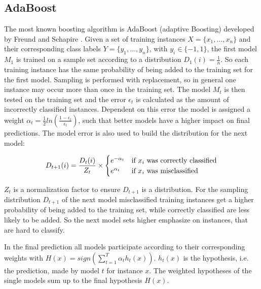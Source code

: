 \documentclass[10pt]{reportMaster}
\begin{document}
\subsection*{AdaBoost}
\label{sec:adaBoost}
The most known boosting algorithm is AdaBoost (adaptive Boosting) developed by Freund and Schapire \cite{boostingIntro}.
Given a set of training instances $X = \{x_1, ..., x_n\}$ and their corresponding class labels $Y = \{y_1, ..., y_n\}$, with $y_i \in \{-1, 1\}$, the first model $M_1$ is trained on a sample set according to a distribution $D_1(i) = \frac{1}{n}$. So each training instance has the same probability of being added to the training set for the first model.
Sampling is performed with replacement, so in general one instance may occur more than once in the training set.
The model $M_t$ is then tested on the training set and the error $\epsilon_t$ is calculated as the amount of incorrectly classified instances.
Dependent on this error the model is assigned a weight $\alpha_t = \frac{1}{2} ln(\frac{1 - \epsilon_t}{\epsilon_t})$, such that better models have a higher impact on final predictions.
The model error is also used to build the distribution for the next model: 

\begin{equation}
\label{eq:adaBootsWeightUpdate}
D_{t+1}(i) = \frac{D_t(i)}{Z_t} \times 
\begin{cases}
e^{-\alpha_t} & \text{if $ x_i $ was correctly classified} \\ 
e^{\alpha_t} & \text{if $ x_i $ was misclassified}
\end{cases}
\end{equation}

$Z_t$ is a normalization factor to ensure $D_{t+1}$ is a distribution.
For the sampling distribution $D_{t+1}$ of the next model misclassified training instances get a higher probability of being added to the training set, while correctly classified are less likely to be added.
So the next model sets higher emphasize on instances, that are hard to classify.

In the final prediction all models participate according to their corresponding weights with $H(x) = sign(\sum_{t = 1}^T\alpha_th_t(x))$.
$h_t(x)$ is the hypothesis, i.e. the prediction, made by model $t$ for instance $x$.
The weighted hypotheses of the single models sum up to the final hypothesis $H(x)$. 
\end{document}
